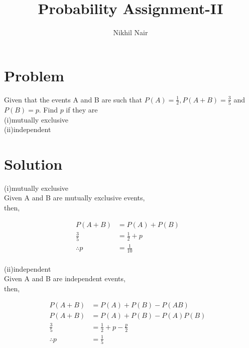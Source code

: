 \documentclass[journal,12pt,twocolumn]{IEEEtran}
\title{\mytitle}
\title{
Probability Assignment-II
}
\author{Nikhil Nair}
\begin{document}
\maketitle
\bigskip



\section{\textbf{Problem }}
Given that the events A and B are such that $P(A)=\frac{1}{2}, P(A + B)=\frac{3}{5}$ and $P(B)=p$. Find $p$ if they are \\
(i)mutually exclusive\\
(ii)independent


\section{\textbf{Solution }}

(i)mutually exclusive
\\
Given A and B are mutually exclusive events,\\
then,

\begin{align}
P(A + B) &=P(A) + P(B)&
\\
\frac{3}{5}&=\frac{1}{2}+p&
\\
\therefore  p &= \frac{1}{10}&
\end{align}
\\

(ii)independent
\\
Given A and B are independent events,\\
then,

\begin{align}
P(A + B) &=P(A) + P(B) - P(A B)& 
\\
P(A + B) &=P(A) + P(B) - P(A)P(B)&
\\
\frac{3}{5}&=\frac{1}{2}+ p - \frac{p}{2}&
\\
\therefore p &= \frac{1}{5}&
\end{align}
\end{document}
